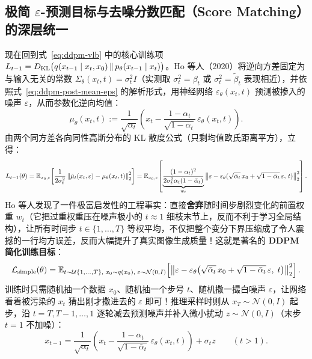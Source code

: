 \subsection{极简 $\varepsilon$-预测目标与去噪分数匹配（Score Matching）的深层统一}

现在回到式~\eqref{eq:ddpm-vlb} 中的核心训练项 $L_{t-1} = D_{\mathrm{KL}}\big(q(x_{t-1} \mid x_t, x_0) \,\|\, p_\theta(x_{t-1} \mid x_t)\big)$。Ho 等人（2020）将逆向方差固定为与输入无关的常数 $\Sigma_\theta(x_t, t) = \sigma_t^2 I$（实测取 $\sigma_t^2 = \beta_t$ 或 $\sigma_t^2 = \tilde{\beta}_t$ 表现相近），并依照式~\eqref{eq:ddpm-post-mean-eps} 的解析形式，用神经网络 $\varepsilon_\theta(x_t, t)$ 预测被掺入的噪声 $\varepsilon$，从而参数化逆向均值：
\begin{equation}
  \mu_\theta(x_t, t) := \frac{1}{\sqrt{\alpha_t}}\!\left(x_t - \frac{1 - \alpha_t}{\sqrt{1 - \bar{\alpha}_t}}\,\varepsilon_\theta(x_t, t)\right).
  \label{eq:ddpm-mu-theta}
\end{equation}
由两个同方差各向同性高斯分布的 KL 散度公式（只剩均值欧氏距离平方），立得：
\[
  L_{t-1}(\theta)
  = \mathbb{E}_{x_0, \varepsilon}\!\left[\frac{1}{2\sigma_t^2}\left\|\tilde{\mu}_t(x_t, \varepsilon) - \mu_\theta(x_t, t)\right\|_2^2\right]
  = \mathbb{E}_{x_0, \varepsilon}\!\left[
      \underbrace{\frac{(1 - \alpha_t)^2}{2\sigma_t^2 \alpha_t (1 - \bar{\alpha}_t)}}_{w_t}
      \left\|\varepsilon - \varepsilon_\theta(\sqrt{\bar{\alpha}_t}\,x_0 + \sqrt{1 - \bar{\alpha}_t}\,\varepsilon,\, t)\right\|_2^2
    \right].
\]
Ho 等人发现了一件极富启发性的工程事实：直接\textbf{舍弃}随时间步剧烈变化的前置权重 $w_t$（它把过重权重压在噪声极小的 $t \approx 1$ 细枝末节上，反而不利于学习全局结构），让所有时间步 $t \in \{1, \dots, T\}$ 等权平均，不仅把整个变分下界压缩成了令人震撼的一行均方误差，反而大幅提升了真实图像生成质量！这就是著名的 \textbf{DDPM 简化训练目标}：
\begin{equation}
  \mathcal{L}_{\mathrm{simple}}(\theta)
  = \mathbb{E}_{t \sim \mathcal{U}\{1,\dots,T\},\; x_0 \sim q(x_0),\; \varepsilon \sim \mathcal{N}(0, I)}
    \!\left[\left\|\varepsilon - \varepsilon_\theta\!\left(\sqrt{\bar{\alpha}_t}\, x_0 + \sqrt{1 - \bar{\alpha}_t}\,\varepsilon,\; t\right)\right\|_2^2\right].
  \label{eq:ddpm-lsimple}
\end{equation}
训练时只需随机抽一个数据 $x_0$、随机抽一个步号 $t$、随机撒一撮白噪声 $\varepsilon$，让网络看着被污染的 $x_t$ 猜出刚才撒进去的 $\varepsilon$ 即可！推理采样时则从 $x_T \sim \mathcal{N}(0, I)$ 起步，沿 $t = T, T-1, \dots, 1$ 逐轮减去预测噪声并补入微小扰动 $z \sim \mathcal{N}(0, I)$（末步 $t=1$ 不加噪）：
\begin{equation}
  x_{t-1} = \frac{1}{\sqrt{\alpha_t}}\!\left(x_t - \frac{1 - \alpha_t}{\sqrt{1 - \bar{\alpha}_t}}\,\varepsilon_\theta(x_t, t)\right) + \sigma_t z \qquad (t > 1).
  \label{eq:ddpm-sample-step}
\end{equation}

